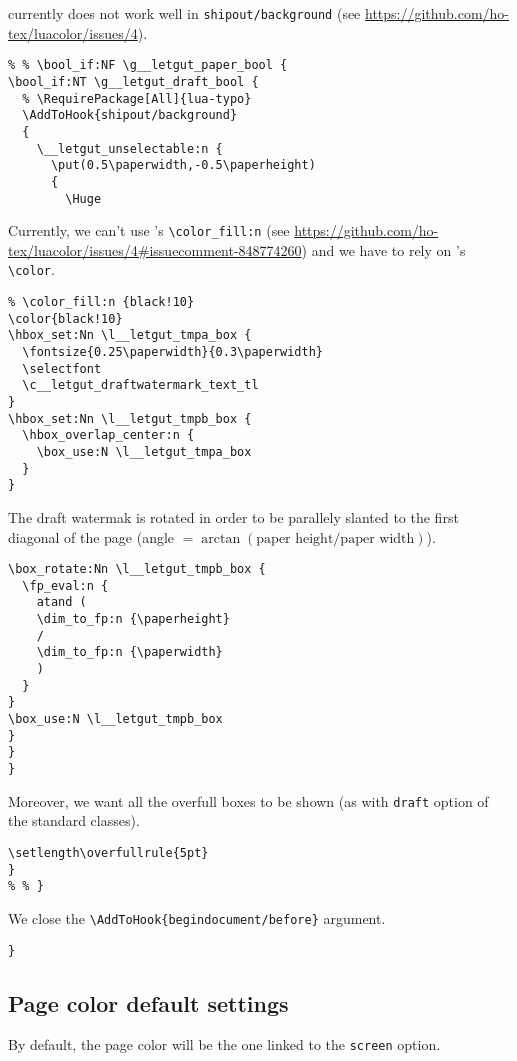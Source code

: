 \documentclass{letgut}
\begin{document}
\begin{itemize}
\begin{itemize}
currently does not work well in \lstinline+shipout/background+ (see
\url{https://github.com/ho-tex/luacolor/issues/4}).
\begin{lstlisting}
% % \bool_if:NF \g__letgut_paper_bool {
\bool_if:NT \g__letgut_draft_bool {
  % \RequirePackage[All]{lua-typo}
  \AddToHook{shipout/background}
  {
    \__letgut_unselectable:n {
      \put(0.5\paperwidth,-0.5\paperheight)
      {
        \Huge
\end{lstlisting}
Currently, we can't use 's \lstinline+\color_fill:n+ (see
\url{https://github.com/ho-tex/luacolor/issues/4\#issuecomment-848774260})
and we have to rely on 's \lstinline+\color+.
\begin{lstlisting}
% \color_fill:n {black!10}
\color{black!10}
\hbox_set:Nn \l__letgut_tmpa_box {
  \fontsize{0.25\paperwidth}{0.3\paperwidth}
  \selectfont
  \c__letgut_draftwatermark_text_tl
}
\hbox_set:Nn \l__letgut_tmpb_box {
  \hbox_overlap_center:n {
    \box_use:N \l__letgut_tmpa_box
  }
}
\end{lstlisting}
The draft watermak is rotated in order to be parallely slanted to the first
diagonal of the page (angle \(=\arctan(\text{paper height}/\text{paper
    width})\)).
\begin{lstlisting}
\box_rotate:Nn \l__letgut_tmpb_box {
  \fp_eval:n {
    atand (
    \dim_to_fp:n {\paperheight}
    /
    \dim_to_fp:n {\paperwidth}
    )
  }
}
\box_use:N \l__letgut_tmpb_box
}
}
}
\end{lstlisting}
	    Moreover, we want all the overfull boxes to be shown (as with
\lstinline+draft+ option of the standard classes).
\begin{lstlisting}
\setlength\overfullrule{5pt}
}
% % }
\end{lstlisting}
\end{itemize}
\end{itemize}

We close the \lstinline+\AddToHook{begindocument/before}+ argument.

\begin{lstlisting}
}
\end{lstlisting}

\subsection{Page color default settings}
\label{ImplementationPagecolordefaultsettings-c1hg55h0jlj0}
By default, the page color will be the one linked to the \lstinline+screen+ option.
\end{document}
